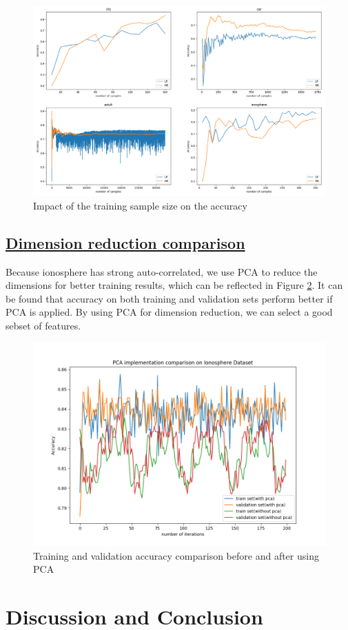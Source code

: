 \documentclass[11pt]{scrartcl}
\begin{document}
\begin{figure}[htbp]
	\centering
	\includegraphics[width=0.8\linewidth]{fig/dataset_size.png}
	\caption{Impact of the training sample size on the accuracy}
	\label{size_accuracy}
\end{figure}

\subsection*{\underline{Dimension reduction comparison}}
Because ionosphere has strong auto-correlated, we use PCA to reduce the dimensions for better training results, which can be reflected in Figure \ref{pca}. It can be found that accuracy on both training and validation sets perform better if PCA is applied. By using PCA for dimension reduction, we can select a good sebset of features.

\begin{figure}[htbp]
	\centering
	\includegraphics[width=0.7\linewidth]{fig/PCA.png}
	\caption{Training and validation accuracy comparison before and after using PCA}
	\label{pca}
\end{figure}

\section{Discussion and Conclusion}
\end{document}
